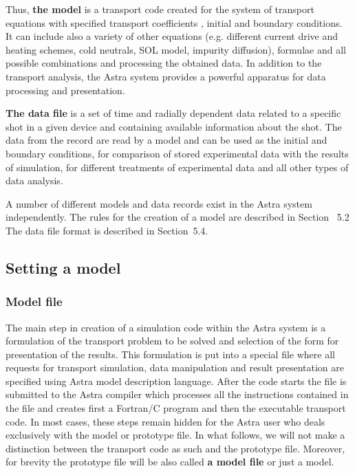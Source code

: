 Thus, {\bf the model} is a transport code created for the system of
transport equations  with specified transport coefficients
, initial and boundary conditions.
It can include also a variety of other equations (e.g. different current
drive and heating schemes, cold neutrals, SOL model, impurity diffusion),
formulae and all possible combinations and processing the obtained data. 
In addition to the transport analysis, the Astra system provides a
powerful apparatus for data processing and presentation.

{\bf The data file} is a set of time and radially dependent data
related to a specific shot in a given device and containing available
information about the shot.
The data from the record are read by a model and can be used as the
initial and boundary conditions, for comparison of stored experimental
data with the results of simulation, for different treatments of
experimental data and all other types of data analysis.

A number of different models and data records exist in the Astra system
independently.
The rules for the creation of a model are described in
Section ~5.2
The data file format is described in Section~5.4.


\subsection{Setting a model}

\subsubsection{Model file}

The main step in creation of a simulation code within the Astra
system is a formulation of the transport problem to be solved and
selection of the form for presentation of the results.
This formulation is put into a special file where all requests
for transport simulation, data manipulation and result presentation 
are specified using Astra model description language.
After the code starts the file is submitted to the Astra compiler 
which processes all the instructions contained in the file and creates
first a Fortran/C program and then the executable transport code.
In most cases, these steps remain hidden for the Astra user who deals
exclusively with the model or prototype file. 
In what follows, we will not make a distinction between the transport
code as such and the prototype file.
Moreover, for brevity the prototype file will be also called
{\bf a model file} or just a model. 

